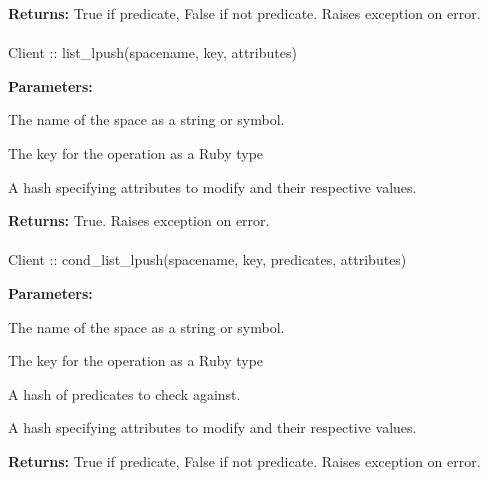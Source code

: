 \noindent\textbf{Returns:}
True if predicate, False if not predicate.  Raises exception on error.

\paragraph{}
\label{api:ruby:list_lpush}
\begin{rubycode}
Client :: list_lpush(spacename, key, attributes)
\end{rubycode}


\noindent\textbf{Parameters:}
\begin{description}[labelindent=\widthof{{\code{attributes}}},leftmargin=*,noitemsep,nolistsep,align=right]
\item[\code{spacename}] The name of the space as a string or symbol.
\item[\code{key}] The key for the operation as a Ruby type
\item[\code{attributes}] A hash specifying attributes to modify and their respective values.
\end{description}

\noindent\textbf{Returns:}
True.  Raises exception on error.

\paragraph{}
\label{api:ruby:cond_list_lpush}
\begin{rubycode}
Client :: cond_list_lpush(spacename, key, predicates, attributes)
\end{rubycode}


\noindent\textbf{Parameters:}
\begin{description}[labelindent=\widthof{{\code{predicates}}},leftmargin=*,noitemsep,nolistsep,align=right]
\item[\code{spacename}] The name of the space as a string or symbol.
\item[\code{key}] The key for the operation as a Ruby type
\item[\code{predicates}] A hash of predicates to check against.
\item[\code{attributes}] A hash specifying attributes to modify and their respective values.
\end{description}

\noindent\textbf{Returns:}
True if predicate, False if not predicate.  Raises exception on error.

